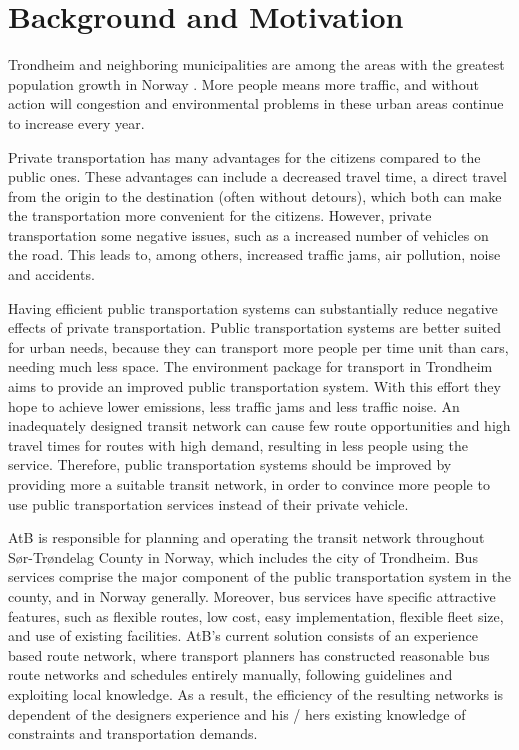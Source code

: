 \section{Background and Motivation}
\label{sec:backgroundAndMotivation}

Trondheim and neighboring municipalities are among the areas with the greatest population growth in Norway \citep{website:miljopakken}. More people means more traffic, and without action will congestion and environmental problems in these urban areas continue to increase every year.

Private transportation has many advantages for the citizens compared to the public ones. These advantages can include a decreased travel time, a direct travel from the origin to the destination (often without detours), which both can make the transportation more convenient for the citizens. However, private transportation some negative issues, such as a increased number of vehicles on the road. This leads to, among others, increased traffic jams, air pollution, noise and accidents. 

Having efficient public transportation systems can substantially reduce negative effects of private transportation. Public transportation systems are better suited for urban needs, because they can transport more people per time unit than cars, needing much less space. The environment package for transport in Trondheim aims to provide an improved public transportation system\citep{website:miljopakken}. With this effort they hope to achieve lower emissions, less traffic jams and less traffic noise. An inadequately designed transit network can cause few route opportunities and high travel times for routes with high demand, resulting in less people using the service. Therefore, public transportation systems should be improved by providing more a suitable transit network, in order to convince more people to use public transportation services instead of their private vehicle.

AtB\citep{website:atb} is responsible for planning and operating the transit network throughout Sør-Trøndelag County in Norway, which includes the city of Trondheim. Bus services comprise the major component of the public transportation system in the county, and in Norway generally. Moreover, bus services have specific attractive features, such as flexible routes, low cost, easy implementation, flexible fleet size, and use of existing facilities. AtB's current solution consists of an experience based route network, where transport planners has constructed reasonable bus route networks and schedules entirely manually, following guidelines and exploiting local knowledge. As a result, the efficiency of the resulting networks is dependent of the designers experience and his / hers existing knowledge of constraints and transportation demands.

